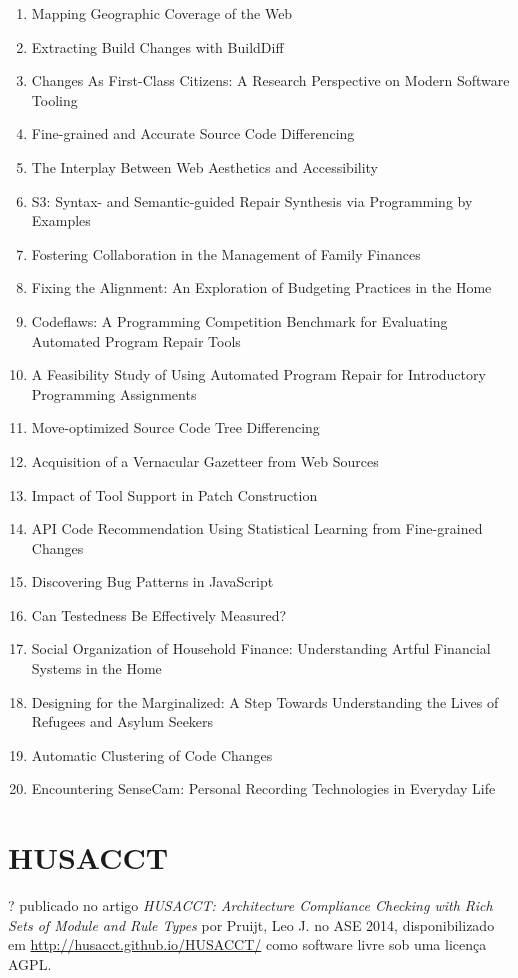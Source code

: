 \begin{enumerate}
\item Mapping Geographic Coverage of the Web
\item Extracting Build Changes with BuildDiff
\item Changes As First-Class Citizens: A Research Perspective on Modern Software Tooling
\item Fine-grained and Accurate Source Code Differencing
\item The Interplay Between Web Aesthetics and Accessibility
\item S3: Syntax- and Semantic-guided Repair Synthesis via Programming by Examples
\item Fostering Collaboration in the Management of Family Finances
\item Fixing the Alignment: An Exploration of Budgeting Practices in the Home
\item Codeflaws: A Programming Competition Benchmark for Evaluating Automated Program Repair Tools
\item A Feasibility Study of Using Automated Program Repair for Introductory Programming Assignments
\item Move-optimized Source Code Tree Differencing
\item Acquisition of a Vernacular Gazetteer from Web Sources
\item Impact of Tool Support in Patch Construction
\item API Code Recommendation Using Statistical Learning from Fine-grained Changes
\item Discovering Bug Patterns in JavaScript
\item Can Testedness Be Effectively Measured?
\item Social Organization of Household Finance: Understanding Artful Financial Systems in the Home
\item Designing for the Marginalized: A Step Towards Understanding the Lives of Refugees and Asylum Seekers
\item Automatic Clustering of Code Changes
\item Encountering SenseCam: Personal Recording Technologies in Everyday Life
\end{enumerate}

\section{HUSACCT}

?
publicado no artigo {\it HUSACCT: Architecture Compliance Checking with Rich Sets of Module and Rule Types}
por Pruijt, Leo J.
no ASE 2014,
disponibilizado em \url{http://husacct.github.io/HUSACCT/}
como software livre
sob uma licença AGPL.

